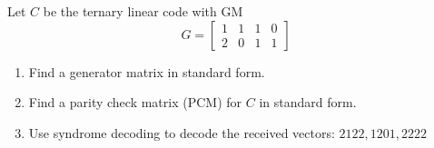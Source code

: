 \documentclass{article}
\theoremstyle{definition}
\newenvironment{ex}[1]
{\renewcommand\theinnerex{#1}\innerex}
{\endinnerex}
\begin{document}
\begin{ex}{7.6}

  Let $C$ be the ternary linear code with GM
  $$G = \begin{bmatrix}
    1 & 1 & 1 & 0 \\
    2 & 0 & 1 & 1
  \end{bmatrix}$$

  \begin{enumerate}
    \item[(a)] Find a generator matrix in standard form.
    \item[(b)] Find a parity check matrix (PCM) for $C$ in standard form.
    \item[(c)] Use syndrome decoding to decode the received vectors:
      $2122, 1201, 2222$
  \end{enumerate}
\end{ex}
\end{document}
